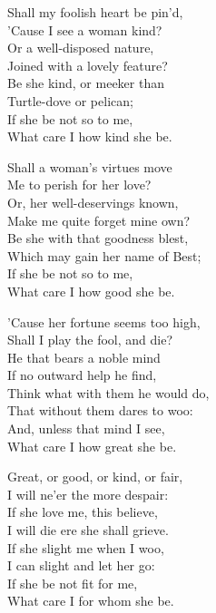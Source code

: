 


\begin{dcverse}
\begin{patverse}
Shall my foolish heart be pin’d,\\
’Cause I see a woman kind?\\
Or a well-disposed nature,\\
Joined with a lovely feature?\\
Be she kind, or meeker than\\
Turtle-dove or pelican;\\
If she be not so to me,\\
What care I how kind she be.
\end{patverse}

\begin{patverse}
Shall a woman’s virtues move\\
Me to perish for her love?\\
Or, her well-deservings known,\\
Make me quite forget mine own?\\
Be she with that goodness blest,\\
Which may gain her name of Best;\\
If she be not so to me,\\
What care I how good she be.
\end{patverse}

\begin{patverse}
’Cause her fortune seems too high,\\
Shall I play the fool, and die?\\
He that bears a noble mind\\
If no outward help he find,\\
Think what with them he would do,\\
That without them dares to woo:\\
And, unless that mind I see,\\
What care I how great she be.
\end{patverse}

\begin{patverse}
Great, or good, or kind, or fair,\\
I will ne’er the more despair:\\
If she love me, this believe,\\
I will die ere she shall grieve.\\
If she slight me when I woo,\\
I can slight and let her go:\\
If she be not fit for me,\\
What care I for whom she be.
\end{patverse}
\end{dcverse}
\pagebreak

